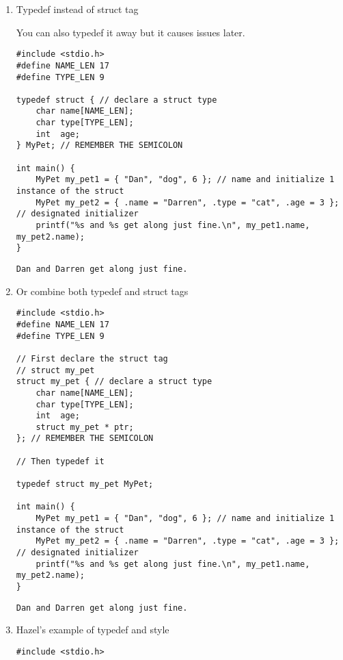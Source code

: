 \documentclass[11pt]{article}
\begin{document}
\begin{enumerate}
\item Typedef instead of struct tag
\label{sec:orgb9de3b5}

You can also typedef it away but it causes issues later.

\begin{verbatim}
#include <stdio.h>
#define NAME_LEN 17
#define TYPE_LEN 9

typedef struct { // declare a struct type
    char name[NAME_LEN];
    char type[TYPE_LEN];
    int  age;
} MyPet; // REMEMBER THE SEMICOLON

int main() {
    MyPet my_pet1 = { "Dan", "dog", 6 }; // name and initialize 1 instance of the struct
    MyPet my_pet2 = { .name = "Darren", .type = "cat", .age = 3 }; // designated initializer
    printf("%s and %s get along just fine.\n", my_pet1.name, my_pet2.name);
}
\end{verbatim}

\begin{verbatim}
Dan and Darren get along just fine.
\end{verbatim}

\item Or combine both typedef and struct tags
\label{sec:orga9ba282}

\begin{verbatim}
#include <stdio.h>
#define NAME_LEN 17
#define TYPE_LEN 9

// First declare the struct tag
// struct my_pet
struct my_pet { // declare a struct type
    char name[NAME_LEN];
    char type[TYPE_LEN];
    int  age;
    struct my_pet * ptr;
}; // REMEMBER THE SEMICOLON

// Then typedef it

typedef struct my_pet MyPet;

int main() {
    MyPet my_pet1 = { "Dan", "dog", 6 }; // name and initialize 1 instance of the struct
    MyPet my_pet2 = { .name = "Darren", .type = "cat", .age = 3 }; // designated initializer
    printf("%s and %s get along just fine.\n", my_pet1.name, my_pet2.name);
}
\end{verbatim}

\begin{verbatim}
Dan and Darren get along just fine.
\end{verbatim}

\item Hazel's example of typedef and style
\label{sec:org2ab375a}

\begin{verbatim}
#include <stdio.h>


\end{verbatim}
\end{enumerate}
\end{document}
